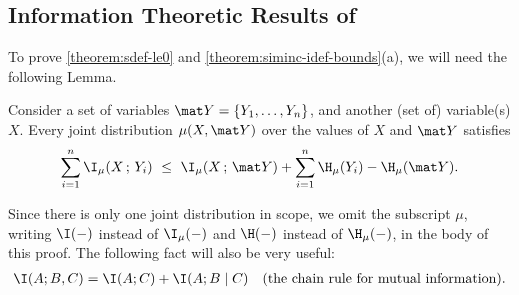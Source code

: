 \begin{subappendices}



\subsection{Information Theoretic Results of }
To prove \cref{theorem:sdef-le0} and \cref{theorem:siminc-idef-bounds}(a), we will need the following Lemma. 

\begin{lemma}
        \label{lem:Y-filter}
    Consider a set of variables $\mat Y = \{Y_1, \ldots, Y_n\}$, and another (set of) variable(s) $X$.
    Every joint distribution $\mu(X, \mat Y)$ over the values of $X$ and $\mat Y$ satisfies
    \[
        \sum_{i=1}^n \I_\mu(X \,;\, Y_i) 
        ~\le~
         \I_{\mu}(X \,;\, \mat Y) 
         + \sum_{i=1}^n \H_\mu(Y_i) - \H_\mu(\mat Y).
    \]
\end{lemma}
\begin{lproof}
    Since there is only one joint distribution in scope, we omit the subscript $\mu$, writing $\I(-)$ instead of $\I_\mu(-)$ and $\H(-)$ instead of $\H_\mu(-)$, in the body of this proof.
    The following fact will also be very useful:
    \begin{align}
        \I(A; B, C) &= \I(A; C) + \I(A; B \mid C)
            &\text{(the chain rule for mutual information).}
            \label{eq:chain-rule-mi}
    \end{align}
    
    

\end{lproof}
\end{subappendices}
